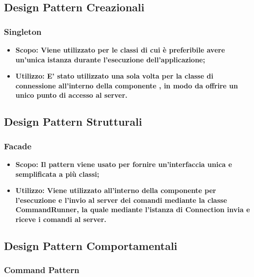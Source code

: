 \documentclass{scalatekids-article}
\begin{document}
\subsection{Design Pattern Creazionali}

\subsubsection{Singleton}

\begin{itemize}
\item \bf{Scopo:} Viene utilizzato per le classi di cui è preferibile avere un'unica istanza
  durante l'esecuzione dell'applicazione;
\item \bf{Utilizzo:} E' stato utilizzato una sola volta per la classe di connessione all'interno
  della componente , in modo da offrire un unico punto di accesso al server.
\end{itemize}

\subsection{Design Pattern Strutturali}

\subsubsection{Facade}

\begin{itemize}
\item \bf{Scopo:} Il pattern  viene usato per fornire
  un'interfaccia unica e semplificata a più classi;
\item \bf{Utilizzo:} Viene utilizzato all'interno della componente
   per l'esecuzione e l'invio al server dei comandi mediante
  la classe CommandRunner, la quale mediante l'istanza  di
  Connection invia e riceve i comandi al server.
\end{itemize}

\subsection{Design Pattern Comportamentali}

\subsubsection{Command Pattern}

\label{sec:CommandPattern}
\end{document}
